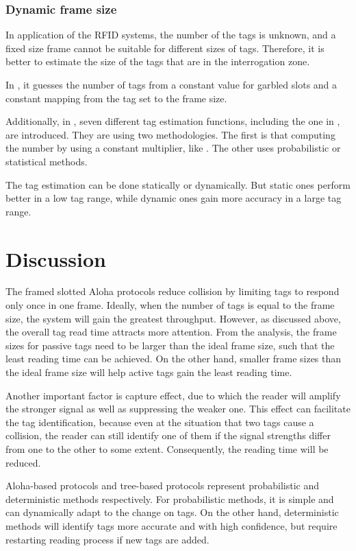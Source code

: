 \documentclass[12pt,letterpaper]{article}
\begin{document}
\subsubsection{Dynamic frame size}
In application of the RFID systems, the number of the tags is unknown,
and a fixed size frame cannot be suitable for different sizes of tags.
Therefore, it is better to estimate the size of the tags that are in 
the interrogation zone.

In \cite{frame}, it guesses the number of tags from a constant value 
for garbled slots and a constant mapping from the tag set to the 
frame size. 

Additionally, in \cite{survey}, seven different tag estimation functions,
including the one in \cite{frame}, are introduced. They are using two
methodologies. The first is that computing the number by using a 
constant multiplier, like \cite{frame}. The other uses probabilistic
or statistical methods. 

The tag estimation can be done statically or dynamically. But static
ones perform better in a low tag range, while dynamic ones
gain more accuracy in a large tag range.

\section{Discussion}
The framed slotted Aloha protocols reduce collision by limiting tags
to respond only once in one frame. Ideally, when the number of tags
is equal to the frame size, the system will gain the greatest throughput.
However, as discussed above, the overall tag read time attracts more
attention. From the analysis, the frame sizes for passive tags need to 
be larger than the ideal frame size, such that the least reading time
can be achieved. On the other hand, smaller frame sizes than the ideal
frame size will help active tags gain the least reading time. 

Another important factor is capture effect, due to which the reader 
will amplify the stronger signal as well as suppressing the weaker 
one. This effect can facilitate the tag identification, because even
at the situation that two tags cause a collision, the reader can still
identify one of them if the signal strengths differ from one to 
the other to some extent. Consequently, the reading time will be
reduced. 

Aloha-based protocols and tree-based protocols represent probabilistic
and deterministic methods respectively. For probabilistic methods, it is 
simple and can dynamically adapt to the change on tags. On the other 
hand, deterministic methods will identify tags more accurate and with
high confidence, but require restarting reading process if new tags are
added. 
\end{document}
